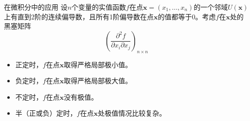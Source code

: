
\begin{frame}

\begin{block}{在微积分中的应用}
设$n$个变量的实值函数$f$在点$\mathbf{x} = (x_1,\ldots,x_n)$的一个邻域$U(\mathbf{x})$上有直到2阶的连续偏导数，且所有1阶偏导数在点$\mathbf{x}$的值都等于0。考虑$f$在$\mathbf{x}$处的黑塞矩阵
\[\left( \dfrac{\partial^2 f}{\partial x_i \partial x_j} \right)_{n\times n}\]
\begin{itemize}
\item 正定时，$f$在点$\mathbf{x}$取得严格局部极小值。
\item 负定时，$f$在点$\mathbf{x}$取得严格局部极大值。
\item 不定时，$f$在点$\mathbf{x}$没有极值。
\pause
\item 半（正或负）定时，$f$在点$\mathbf{x}$处极值情况比较复杂。
\end{itemize}
\end{block}

\end{frame}












